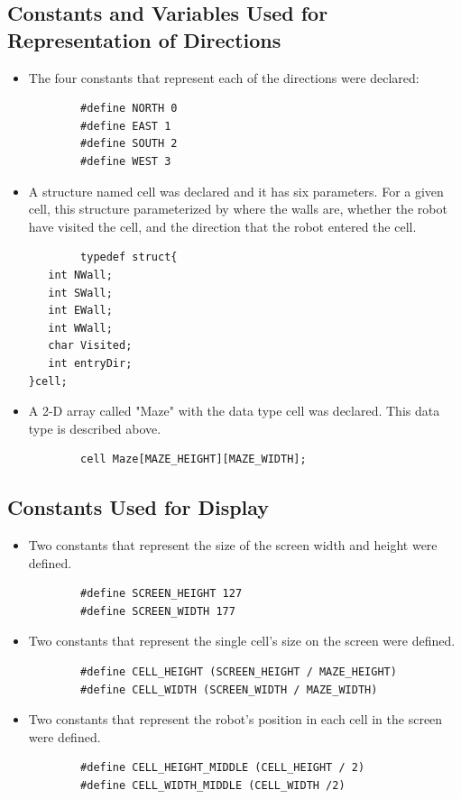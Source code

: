 \documentclass[11pt]{article}
\begin{document}

\subsection{Constants and Variables Used for Representation of Directions}
\begin{itemize}
\item The four constants that represent each of the directions were declared:
	\begin{verbatim}
		#define NORTH 0
		#define EAST 1
		#define SOUTH 2
		#define WEST 3
	\end{verbatim}
\item A structure named cell was declared and it has six parameters. For a given cell, this structure parameterized by where the walls are, whether the robot have visited the cell, and the direction that the robot entered the cell.
	\begin{verbatim}
		typedef struct{
   int NWall; 
   int SWall; 
   int EWall; 
   int WWall; 
   char Visited;
   int entryDir;
}cell;\end{verbatim}
\item A 2-D array called "Maze" with the data type cell was declared. This data type is described above.
	\begin{verbatim}
		cell Maze[MAZE_HEIGHT][MAZE_WIDTH];
	\end{verbatim}
\end{itemize}


\subsection{Constants Used for Display}
\begin{itemize}
\item Two constants that represent the size of the screen width and height were defined.
	\begin{verbatim}
		#define SCREEN_HEIGHT 127
		#define SCREEN_WIDTH 177 
	\end{verbatim} 
\item Two constants that represent the single cell's size on the screen were defined.
	\begin{verbatim}
		#define CELL_HEIGHT (SCREEN_HEIGHT / MAZE_HEIGHT)
		#define CELL_WIDTH (SCREEN_WIDTH / MAZE_WIDTH)
	\end{verbatim} 
\item Two constants that represent the robot's position in each cell in the screen were defined.
	\begin{verbatim}
		#define CELL_HEIGHT_MIDDLE (CELL_HEIGHT / 2)
		#define CELL_WIDTH_MIDDLE (CELL_WIDTH /2)
	\end{verbatim}
\end{itemize}
\newpage
\end{document}
